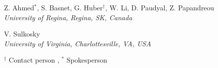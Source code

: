 \documentclass{article}
\begin{document}
\begin{center}
Z. Ahmed$^\ast$, S. Basnet, G. Huber$^\dagger$, W. Li, D. Paudyal, Z. Papandreou\\
\vspace*{5pt}
{\it University of Regina, Regina, SK, Canada}
\vspace*{20pt}

V. Sulkosky  \\
\vspace*{5pt}
{\it University of Virginia, Charlottesville, VA, USA}
\vspace*{20pt}

\end{center}

$^\dagger$ Contact person , $^\ast$ Spokesperson

\vfill\eject

\clearpage



\newpage

\tableofcontents
\end{document}
